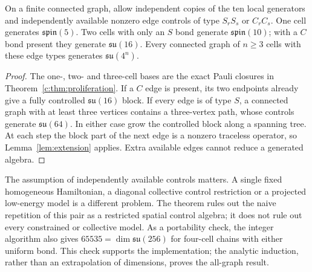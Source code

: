 \begin{theorem}\label{thm:graph}
On a finite connected graph, allow independent copies of the ten local generators and independently available nonzero edge controls of type $S_rS_s$ or $C_rC_s$.
One cell generates $\mathfrak{spin}(5)$.
Two cells with only an $S$ bond generate $\mathfrak{spin}(10)$; with a $C$ bond present they generate $\mathfrak{su}(16)$.
Every connected graph of $n\geq3$ cells with these edge types generates $\mathfrak{su}(4^n)$.
\end{theorem}
\begin{proof}
The one-, two- and three-cell bases are the exact Pauli closures in Theorem~\ref{c:thm:proliferation}.
If a $C$ edge is present, its two endpoints already give a fully controlled $\mathfrak{su}(16)$ block.
If every edge is of type $S$, a connected graph with at least three vertices contains a three-vertex path, whose controls generate $\mathfrak{su}(64)$.
In either case grow the controlled block along a spanning tree.
At each step the block part of the next edge is a nonzero traceless operator, so Lemma~\ref{lem:extension} applies.
Extra available edges cannot reduce a generated algebra.
\end{proof}

The assumption of independently available controls matters.
A single fixed homogeneous Hamiltonian, a diagonal collective control restriction or a projected low-energy model is a different problem.
The theorem rules out the naive repetition of this pair as a restricted spatial control algebra; it does not rule out every constrained or collective model.
As a portability check, the integer algorithm also gives $65535=\dim\mathfrak{su}(256)$ for four-cell chains with either uniform bond.
This check supports the implementation; the analytic induction, rather than an extrapolation of dimensions, proves the all-graph result.
